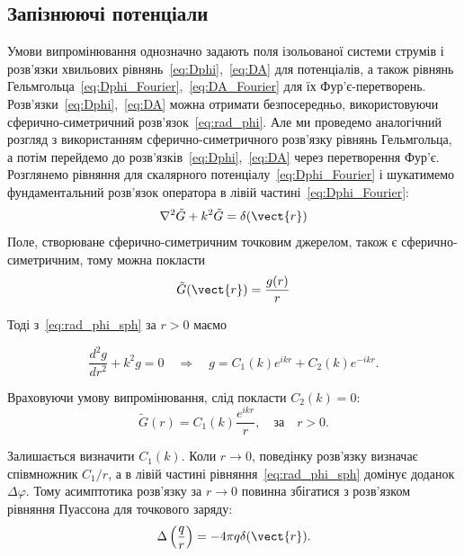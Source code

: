 \subsection*{Запізнюючі потенціали}


Умови випромінювання однозначно задають поля ізольованої системи струмів і розв’язки хвильових рівнянь~\eqref{eq:Dphi},~\eqref{eq:DA} для потенціалів, а
також рівнянь
Гельмгольца~\eqref{eq:Dphi_Fourier},~\eqref{eq:DA_Fourier} для їх Фур’є-перетворень. Розв’язки~\eqref{eq:Dphi},~\eqref{eq:DA} можна отримати
безпосередньо,
використовуючи сферично-симетричний
розв’язок~\eqref{eq:rad_phi}. Але ми проведемо аналогічний розгляд з використанням сферично-симетричного розв’язку рівнянь Гельмгольца, а потім
перейдемо до
розв’язків~\eqref{eq:Dphi},~\eqref{eq:DA} через перетворення Фур’є. Розглянемо рівняння для скалярного потенціалу~\eqref{eq:Dphi_Fourier} і шукатимемо
фундаментальний
розв’язок
оператора в лівій частині~\eqref{eq:Dphi_Fourier}:
\begin{equation}
	\nabla^2\tilde{G} + k^2\tilde{G} = \delta(\vect{r})
\end{equation}
Поле, створюване сферично-симетричним точковим джерелом, також є сферично-симетричним, тому можна покласти
\begin{equation}
	\tilde{G} (\vect{r}) = \frac{g(r)}{r}
\end{equation}

Тоді з~\eqref{eq:rad_phi_sph} за $r>0$ маємо

\begin{equation}
	\frac{d^2 g}{dr^2} + k^2 g = 0 \quad \Rightarrow \quad g = C_1(k) e^{ikr} + C_2(k) e^{-ikr}.
\end{equation}

Враховуючи умову випромінювання, слід покласти $C_2(k)=0$:
\begin{equation}
	\tilde{G}(r) = C_1(k) \frac{e^{ikr}}{r}, \quad \text{за} \quad r>0.
\end{equation}

Залишається визначити $C_1(k)$. Коли $r \to 0$, поведінку розв’язку визначає співмножник $C_1/r$, а в лівій частині рівняння~\eqref{eq:rad_phi_sph}
домінує доданок
$\Delta \varphi$. Тому асимптотика розв’язку за $r \to 0$ повинна збігатися з розв’язком рівняння Пуассона для точкового заряду:
\begin{equation}
	\Delta \left( \frac{q}{r} \right) = -4\pi q \delta (\vect{r}).
\end{equation}

